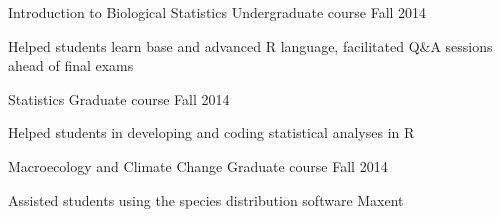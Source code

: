 \begin{cventries}
{\begin{cvsubentries}
{\begin{cvitems}
         \end{cvitems} 
         }
       \cvsubentry
         {Introduction to Biological Statistics}
         {\footnotesize Undergraduate course}
         {Fall 2014}
         {
         \begin{cvitems}
          \item Helped students learn base and advanced R language, facilitated Q\&A sessions ahead of final exams
         \end{cvitems} 
         }
       \cvsubentry
        {Statistics}
        {\footnotesize Graduate course}
        {Fall 2014}
        {
          \begin{cvitems}
          \item Helped students in developing and coding statistical analyses in R
         \end{cvitems}
        }  
       \cvsubentry
        {Macroecology and Climate Change}
        {\footnotesize Graduate course}
        {Fall 2014}
        {
          \begin{cvitems}
          \item Assisted students using the species distribution software Maxent
         \end{cvitems}
        }   
      \end{cvsubentries}
    }
\end{cventries}




    


